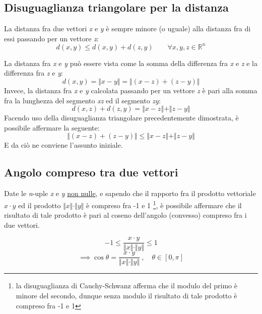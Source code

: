 				\subsection{Disuguaglianza triangolare per la distanza}
				La distanza fra due vettori \textit{x} e \textit{y} è sempre minore (o uguale) alla distanza fra di essi passando per un vettore \textit{z}:
				$$ d(x, y) \leq d(x, y) + d(z, y) \qquad \forall x, y, z \in \mathbb{R}^n $$
			
				\begin{GrayBox}
					La distanza fra \textit{x} e \textit{y} può essere vista come la somma della differenza fra \textit{x} e \textit{z} e la differenza fra \textit{z} e \textit{y}:
					$$ d(x, y) = \Vert x - y \Vert = \Vert (x - z) + (z - y) \Vert $$
					Invece, la distanza fra \textit{x} e \textit{y} calcolata passando per un vettore \textit{z} è pari alla somma fra la lunghezza del segmento \textit{xz} ed il segmento \textit{zy}:
					$$ d(x, z) + d(z, y) = \Vert x - z \Vert + \Vert z - y \Vert $$
					Facendo uso della disuguaglianza triangolare precedentemente dimostrata, è possibile affermare la seguente:
					$$ \Vert (x - z) + (z - y) \Vert \leq \Vert x - z \Vert + \Vert z - y \Vert $$
					E da ciò ne conviene l'assunto iniziale.
				\end{GrayBox}
			
			\subsection{Angolo compreso tra due vettori}
				Date le \textit{n}-uple \textit{x} e \textit{y} \underline{non nulle}, e sapendo che il rapporto fra il prodotto vettoriale $ x \cdot y $ ed il prodotto $ \Vert x \Vert \cdot \Vert y \Vert $ è compreso fra -1 e 1 \footnote{la disuguaglianza di Cauchy-Schwanz afferma che il modulo del primo è minore del secondo, dunque senza modulo il risultato di tale prodotto è compreso fra -1 e 1}, è possibile affermare che il risultato di tale prodotto è pari al coseno dell'angolo (convesso) compreso fra i due vettori.
				\begin{GrayBox}
					$$ -1 \leq \frac{x \cdot y}{\Vert x \Vert \cdot \Vert y \Vert} \leq 1 $$
					$$ \implies \cos \theta = \frac{x \cdot y}{\Vert x \Vert \cdot \Vert y \Vert} \: , \quad \theta \in [0, \pi] $$
				\end{GrayBox}